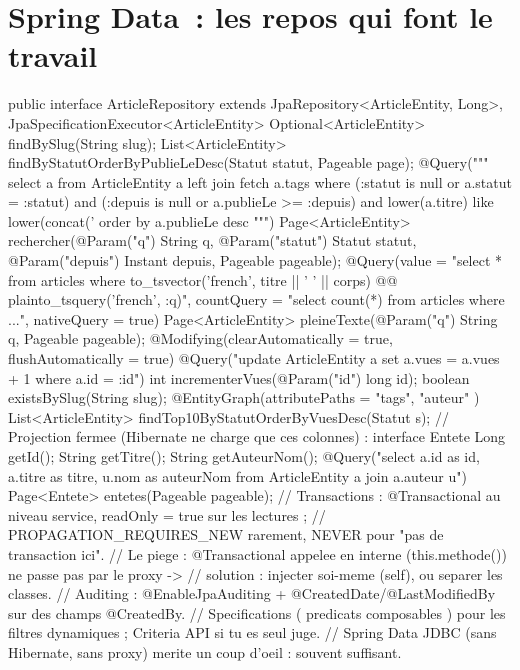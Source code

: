 \section{Spring Data~: les repos qui font le travail}

\begin{codejava}
public interface ArticleRepository extends JpaRepository<ArticleEntity, Long>, JpaSpecificationExecutor<ArticleEntity> {
    Optional<ArticleEntity> findBySlug(String slug);
    List<ArticleEntity> findByStatutOrderByPublieLeDesc(Statut statut, Pageable page);
    @Query("""
           select a from ArticleEntity a left join fetch a.tags
           where (:statut is null or a.statut = :statut)
             and (:depuis is null or a.publieLe >= :depuis)
             and lower(a.titre) like lower(concat('%
           order by a.publieLe desc
           """)
    Page<ArticleEntity> rechercher(@Param("q") String q, @Param("statut") Statut statut,
                                   @Param("depuis") Instant depuis, Pageable pageable);
    @Query(value = "select * from articles where to_tsvector('french', titre || ' ' || corps) @@ plainto_tsquery('french', :q)",
           countQuery = "select count(*) from articles where ...", nativeQuery = true)
    Page<ArticleEntity> pleineTexte(@Param("q") String q, Pageable pageable);
    @Modifying(clearAutomatically = true, flushAutomatically = true)
    @Query("update ArticleEntity a set a.vues = a.vues + 1 where a.id = :id")
    int incrementerVues(@Param("id") long id);
    boolean existsBySlug(String slug);
    @EntityGraph(attributePaths = { "tags", "auteur" }) List<ArticleEntity> findTop10ByStatutOrderByVuesDesc(Statut s);
}
// Projection fermee (Hibernate ne charge que ces colonnes) :
interface Entete { Long getId(); String getTitre(); String getAuteurNom(); }
@Query("select a.id as id, a.titre as titre, u.nom as auteurNom from ArticleEntity a join a.auteur u")
Page<Entete> entetes(Pageable pageable);
// Transactions : @Transactional au niveau service, readOnly = true sur les lectures ;
// PROPAGATION_REQUIRES_NEW rarement, NEVER pour "pas de transaction ici".
// Le piege : @Transactional appelee en interne (this.methode()) ne passe pas par le proxy ->
// solution : injecter soi-meme (self), ou separer les classes.
// Auditing : @EnableJpaAuditing + @CreatedDate/@LastModifiedBy sur des champs @CreatedBy.
// Specifications ( predicats composables ) pour les filtres dynamiques ; Criteria API si tu es seul juge.
// Spring Data JDBC (sans Hibernate, sans proxy) merite un coup d'oeil : souvent suffisant.
\end{codejava}

